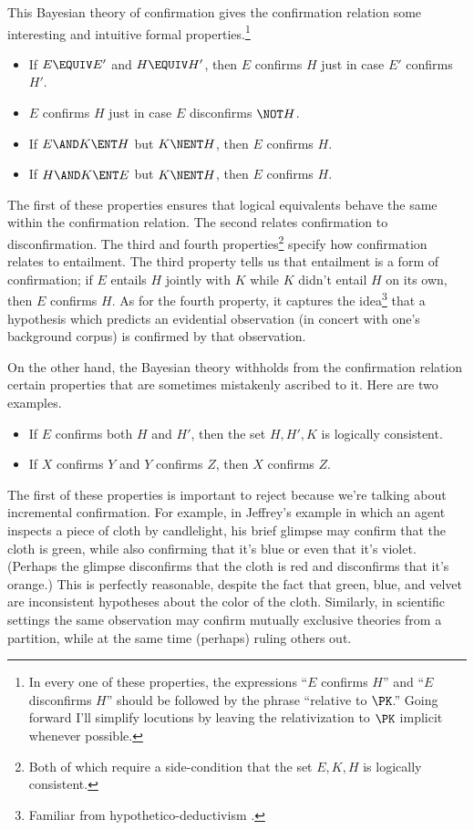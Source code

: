 This Bayesian theory of confirmation gives the confirmation relation some interesting and intuitive formal properties.\footnote
{In every one of these properties, the expressions ``$E$ confirms $H$'' and ``$E$ disconfirms $H$'' should be followed by the phrase ``relative to $\PK$.'' Going forward I'll simplify locutions by leaving the relativization to $\PK$ implicit whenever possible.}
\begin{itemize}
\item{If $E \EQUIV E'$ and $H \EQUIV H'$, then $E$ confirms $H$ just in case $E'$ confirms $H'$.}
\item{$E$ confirms $H$ just in case $E$ disconfirms $\NOT H$.}
\item{If $E \AND K \ENT H$ but $K \NENT H$, then $E$ confirms $H$.}
\item{If $H \AND K \ENT E$ but $K \NENT H$, then $E$ confirms $H$.}
\end{itemize}
The first of these properties ensures that logical equivalents behave the same within the confirmation relation. The second relates confirmation to disconfirmation. The third and fourth properties\footnote
{Both of which require a side-condition that the set ${E, K, H}$ is logically consistent.} 
 specify how confirmation relates to entailment. The third property tells us that entailment is a form of confirmation; if $E$ entails $H$ jointly with $K$ while $K$ didn't entail $H$ on its own, then $E$ confirms $H$. As for the fourth property, it captures the idea\footnote
{Familiar from hypothetico-deductivism \citep[Section 2]{CrupiSEP}.}
 that a hypothesis which predicts an evidential observation (in concert with one's background corpus) is confirmed by that observation.
 
On the other hand, the Bayesian theory withholds from the confirmation relation certain properties that are sometimes mistakenly ascribed to it. Here are two examples.
\begin{itemize}
\item{If $E$ confirms both $H$ and $H'$, then the set ${H, H', K}$ is logically consistent.}
\item{If $X$ confirms $Y$ and $Y$ confirms $Z$, then $X$ confirms $Z$.}
\end{itemize} 
The first of these properties is important to reject because we're talking about incremental confirmation. For example, in Jeffrey's example in which an agent inspects a piece of cloth by candlelight, his brief glimpse may confirm that the cloth is green, while also confirming that it's blue or even that it's violet. (Perhaps the glimpse disconfirms that the cloth is red and disconfirms that it's orange.) This is perfectly reasonable, despite the fact that green, blue, and velvet are inconsistent hypotheses about the color of the cloth. Similarly, in scientific settings the same observation may confirm mutually exclusive theories from a partition, while at the same time (perhaps) ruling others out.

